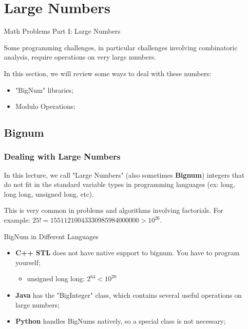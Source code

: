 
\section{Large Numbers}

\begin{frame}{Math Problems Part I: Large Numbers}

  Some programming challenges, in particular challenges involving combinatoric analysis, require operations on very large numbers.\bigskip

  In this section, we will review some ways to deal with these numbers:
  \begin{itemize}
    \item "BigNum" libraries;
    \item Modulo Operations;
  \end{itemize}
\end{frame}

\subsection{Bignum}
\begin{frame}
  \frametitle{Dealing with Large Numbers}

  In this lecture, we call "Large Numbers" (also sometimes {\bf Bignum}) integers that do not fit in the standard variable types in programming languages (ex: long, long long, unsigned long, etc).\bigskip

  This is very common in problems and algorithms involving factorials. For example: $25! = 15511210043330985984000000 > 10^{26}$.\bigskip

  \begin{block}{BigNum in Different Languages}
    \begin{itemize}
      \item {\bf C++ STL} does not have native support to bignum. You have to program yourself;
      \begin{itemize}
        \item unsigned long long: $2^{64} < 10^20$
      \end{itemize}
      \item {\bf Java} has the "BigInteger" class, which contains several useful operations on large numbers;
      \item {\bf Python} handles BigNums natively, so a special class is not necessary;
    \end{itemize}
  \end{block}
\end{frame}

